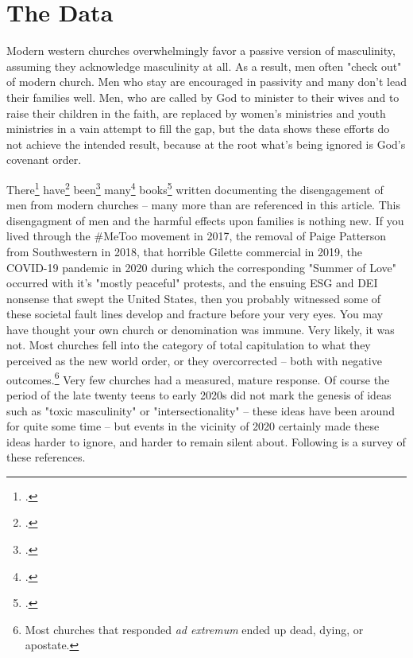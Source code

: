 \ifdefined\embedversion\newpage\fi
\section{The Data}
Modern western churches overwhelmingly favor a passive version of masculinity, assuming they acknowledge masculinity at all.  As a result, men often "check out" of modern church.  Men who stay are encouraged in passivity and many don't lead their families well.  Men, who are called by God to minister to their wives and to raise their children in the faith, are replaced by women's ministries and youth ministries in a vain attempt to fill the gap, but the data shows these efforts do not achieve the intended result, because at the root what's being ignored is God's covenant order.

There\footcite{murrowmen} have\footcite{bauchamdriven} been\footcite{hamgone} many\footcite{coughlinnice} books\footcite{fosterman} written documenting the disengagement of men from modern churches -- many more than are referenced in this article.  This disengagment of men and the harmful effects upon families is nothing new.  If you lived through the \#MeToo movement in 2017, the removal of Paige Patterson from Southwestern in 2018, that horrible Gilette commercial in 2019, the COVID-19 pandemic in 2020 during which the corresponding "Summer of Love" occurred with it's "mostly peaceful" protests, and the ensuing ESG and DEI nonsense that swept the United States, then you probably witnessed some of these societal fault lines develop and fracture before your very eyes.  You may have thought your own church or denomination was immune.  Very likely, it was not.  Most churches fell into the category of total capitulation to what they perceived as the new world order, or they overcorrected -- both with negative outcomes.\footnote{Most churches that responded \textit{ad extremum} ended up dead, dying, or apostate.} Very few churches had a measured, mature response.  Of course the period of the late twenty teens to early 2020s did not mark the genesis of ideas such as "toxic masculinity" or "intersectionality" -- these ideas have been around for quite some time -- but events in the vicinity of 2020 certainly made these ideas harder to ignore, and harder to remain silent about.  Following is a survey of these references.

